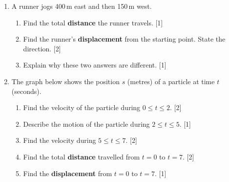 \documentclass[12pt, twoside]{article}
\begin{document}
\begin{enumerate}[itemsep=0.25cm]

\item A runner jogs 400\,m east and then 150\,m west.
\begin{enumerate}[itemsep=0.15cm]
  \item Find the total \textbf{distance} the runner travels. \hfill [1]
  \item Find the runner's \textbf{displacement} from the starting point.
        State the direction. \hfill [2]
  \item Explain why these two answers are different. \hfill [1]
\end{enumerate}

\item The graph below shows the position $s$ (metres) of a particle
      at time $t$ (seconds).

\begin{center}
\vspace{-0.3cm}
\vspace{-0.3cm}
\end{center}

\begin{enumerate}[itemsep=0.15cm]
  \item Find the velocity of the particle during $0 \leq t \leq 2$. \hfill [2]
  \item Describe the motion of the particle during $2 \leq t \leq 5$. \hfill [1]
  \item Find the velocity during $5 \leq t \leq 7$. \hfill [2]
  \item Find the total \textbf{distance} travelled from $t=0$ to $t=7$. \hfill [2]
  \item Find the \textbf{displacement} from $t=0$ to $t=7$. \hfill [1]
\end{enumerate}


\end{enumerate}
\end{document}
